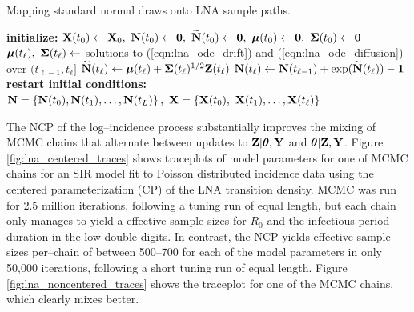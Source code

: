 \begin{algorithm}[htbp]
	\caption{Mapping standard normal draws onto LNA sample paths.}
	\label{alg:doLNA}
	\begin{algorithmic}[1]
		\State \textbf{initialize: }$ \bX(t_0) \gets \bX_0,\ \bN(t_0) \gets \bs{0},\ \bNtil(t_0) \gets \bs{0},\ \bmu(t_0) \gets \bs{0},\ \bSigma(t_0) \gets \bs{0} $
		\State $ \boldsymbol{\mu}(t_\ell),\ \boldsymbol{\Sigma}(t_\ell) \gets $ solutions to (\ref{eqn:lna_ode_drift}) and (\ref{eqn:lna_ode_diffusion}) over $ (t_{\ell-1}, t_\ell] $
		\State $ \widetilde{\mathbf{N}}(t_\ell)\gets \boldsymbol{\mu}(t_\ell) + \boldsymbol{\Sigma}(t_\ell)^{1/2}\mathbf{Z}(t_\ell) $ 
		\State $ \mathbf{N}(t_\ell)\gets \mathbf{N}(t_{\ell-1}) + \exp(\widetilde{\mathbf{N}}(t_\ell)) - \boldsymbol{1} $
		\State \textbf{restart initial conditions:} 
		\EndFor
		\State \hspace{-0.25in}\Return {}
		\State$\mathbf{N} = \left \lbrace\mathbf{N}(t_0),\mathbf{N}(t_1),\dots,\mathbf{N}(t_L)\right \rbrace,\ \mathbf{X} = \left \lbrace \mathbf{X}(t_0),\ \mathbf{X}(t_1),\dots,\mathbf{X}(t_\ell) \right \rbrace $
		\EndProcedure
	\end{algorithmic}
\end{algorithm}

The NCP of the log--incidence process substantially improves the mixing of MCMC chains that alternate between updates to $ \mathbf{Z}|\boldsymbol{\theta},\mathbf{Y} $ and $ \boldsymbol{\theta}|\mathbf{Z},\mathbf{Y} $. Figure \ref{fig:lna_centered_traces} shows traceplots of model parameters for one of MCMC chains for an SIR model fit to Poisson distributed incidence data using the centered parameterization (CP) of the LNA transition density. MCMC was run for 2.5 million iterations, following a tuning run of equal length, but each chain only manages to yield a effective sample sizes for $ R_0 $ and the infectious period duration in the low double digits. In contrast, the NCP yields effective sample sizes per--chain of between 500--700 for each of the model parameters in only 50,000 iterations, following a short tuning run of equal length. Figure \ref{fig:lna_noncentered_traces} shows the traceplot for one of the MCMC chains, which clearly mixes better. 

